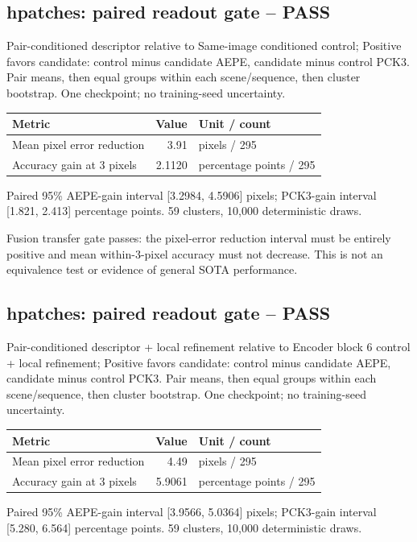\documentclass[10pt]{article}
\begin{document}
\subsection{hpatches: paired readout gate -- PASS}
Pair-conditioned descriptor relative to Same-image conditioned control; Positive favors candidate: control minus candidate AEPE, candidate minus control PCK3. Pair means, then equal groups within each scene/sequence, then cluster bootstrap. One checkpoint; no training-seed uncertainty.
\begin{center}\begin{tabular}{p{.57\linewidth}rp{.23\linewidth}}\toprule Metric & Value & Unit / count \\ \midrule
Mean pixel error reduction & 3.91 & pixels / 295 \\
Accuracy gain at 3 pixels & 2.1120 & percentage points / 295 \\
\bottomrule\end{tabular}\end{center}
Paired 95\% AEPE-gain interval [3.2984, 4.5906] pixels; PCK3-gain interval [1.821, 2.413] percentage points. 59 clusters, 10,000 deterministic draws.

Fusion transfer gate passes: the pixel-error reduction interval must be entirely positive and mean within-3-pixel accuracy must not decrease. This is not an equivalence test or evidence of general SOTA performance.

\subsection{hpatches: paired readout gate -- PASS}
Pair-conditioned descriptor + local refinement relative to Encoder block 6 control + local refinement; Positive favors candidate: control minus candidate AEPE, candidate minus control PCK3. Pair means, then equal groups within each scene/sequence, then cluster bootstrap. One checkpoint; no training-seed uncertainty.
\begin{center}\begin{tabular}{p{.57\linewidth}rp{.23\linewidth}}\toprule Metric & Value & Unit / count \\ \midrule
Mean pixel error reduction & 4.49 & pixels / 295 \\
Accuracy gain at 3 pixels & 5.9061 & percentage points / 295 \\
\bottomrule\end{tabular}\end{center}
Paired 95\% AEPE-gain interval [3.9566, 5.0364] pixels; PCK3-gain interval [5.280, 6.564] percentage points. 59 clusters, 10,000 deterministic draws.
\end{document}

